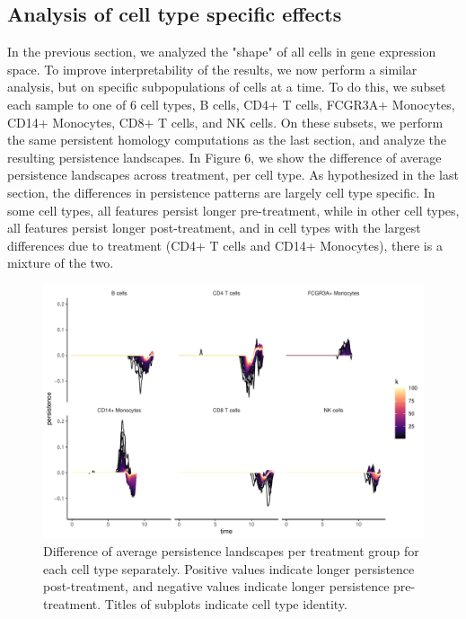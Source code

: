 \documentclass[11pt]{article}
\begin{document}
\subsection{Analysis of cell type specific effects}

In the previous section, we analyzed the "shape" of all cells in gene expression space. To improve interpretability of the results, we now perform a similar analysis, but on specific subpopulations of cells at a time. To do this, we subset each sample to one of 6 cell types, B cells, CD4+ T cells, FCGR3A+ Monocytes, CD14+ Monocytes, CD8+ T cells, and NK cells. On these subsets, we perform the same persistent homology computations as the last section, and analyze the resulting persistence landscapes. In Figure 6, we show the difference of average persistence landscapes across treatment, per cell type. As hypothesized in the last section, the differences in persistence patterns are largely cell type specific. In some cell types, all features persist longer pre-treatment, while in other cell types, all features persist longer post-treatment, and in cell types with the largest differences due to treatment (CD4+ T cells and CD14+ Monocytes), there is a mixture of the two.

\begin{figure}[!htb]
    \centering
	\includegraphics[width=14cm]{results/combined_persistence_landscape_difference.pdf}
    \caption{Difference of average persistence landscapes per treatment group for each cell type separately. Positive values indicate longer persistence post-treatment, and negative values indicate longer persistence pre-treatment. Titles of subplots indicate cell type identity.}
\end{figure}
\end{document}
